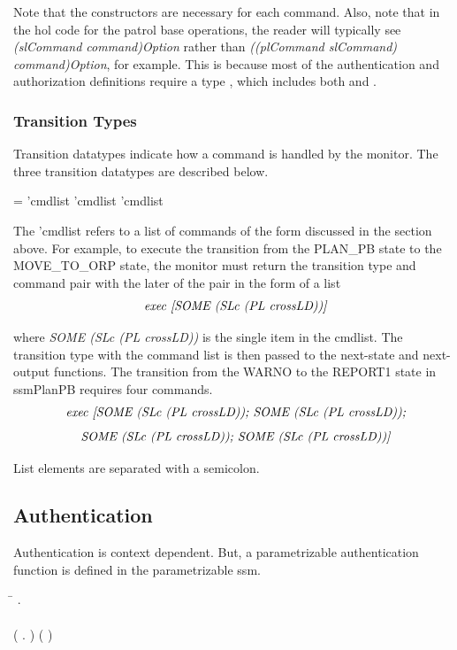 \documentclass[../../main/main.tex]{subfiles}
\begin{document}
Note that the constructors are necessary for each command. Also, note that in the \gls{hol} code for the patrol base operations, the reader will typically see \textit{(slCommand command)Option} rather than \textit{((plCommand slCommand) command)Option}, for example.  This is because most of the authentication and authorization definitions require a type , which includes both   and .




\subsubsection{Transition Types}
Transition datatypes indicate how a command is handled by the monitor.  The three transition datatypes are described below. 

 =  'cmdlist \HOLTokenBar{}  'cmdlist \HOLTokenBar{}  'cmdlist

The 'cmdlist refers to a list of commands of the form discussed in the section above.  For example, to execute the transition from the PLAN_PB state to the MOVE_TO_ORP state, the monitor must return the transition type and command pair with the later of the pair in the form of a list 
\[\text{\textit{exec [SOME (SLc (PL crossLD))]}} \]

where \textit{SOME (SLc (PL crossLD))} is the single item in the cmdlist.  The transition type with the command list is then passed to the next-state and next-output functions.  The transition from the WARNO to the REPORT1 state in ssmPlanPB requires four commands.
\[\text{\textit{exec [SOME (SLc (PL crossLD)); SOME (SLc (PL crossLD));}} \]
\[\text{\textit{SOME (SLc (PL crossLD)); SOME (SLc (PL crossLD))]}} \]

List elements are separated with a semicolon.

\subsection{Authentication}
Authentication is context dependent. But, a parametrizable authentication function is defined in the parametrizable \gls{ssm}.

\begin{tabbing}
\parskip=8pt

\HOLTokenTurnstile{} \=\HOLSymConst{\HOLTokenForall{}} . \\
    \>     \HOLSymConst{\HOLTokenEquiv{}} \\
    \>  (\HOLTokenLambda{} .  \HOLSymConst{\HOLTokenConj{}} )  (  )
\parskip=18pt
\end{tabbing}
\end{document}
